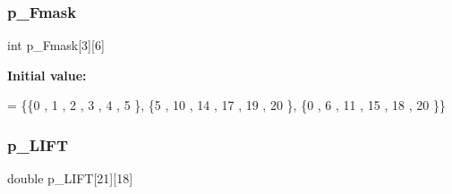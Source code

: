 \subsubsection{\texorpdfstring{p\+\_\+\+Fmask}{p\_Fmask}}
{\footnotesize\ttfamily int p\+\_\+\+Fmask\mbox{[}3\mbox{]}\mbox{[}6\mbox{]}}

{\bfseries Initial value\+:}
\begin{DoxyCode}
= \{\{0 , 1 , 2 , 3 , 4 , 5 \},
\{5 , 10 , 14 , 17 , 19 , 20 \},
\{0 , 6 , 11 , 15 , 18 , 20 \}\}
\end{DoxyCode}
\mbox{\label{a00518_af675a8dc393fa5980f6736a9b66361f2}} 
\subsubsection{\texorpdfstring{p\+\_\+\+L\+I\+FT}{p\_LIFT}}
{\footnotesize\ttfamily double p\+\_\+\+L\+I\+FT\mbox{[}21\mbox{]}\mbox{[}18\mbox{]}}

